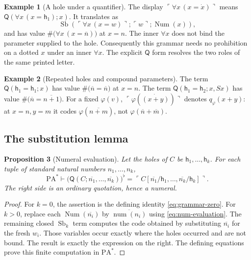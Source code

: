 \documentclass[11pt]{article}
\newcommand{\PA}{\mathrm{PA}^{*}}
\newcommand{\num}{\operatorname{num}}
\newcommand{\Num}{\operatorname{Num}}
\newcommand{\Sb}{\operatorname{Sb}}
\newcommand{\Q}{\mathsf Q}
\newcommand{\h}{\mathsf h}
\newcommand{\code}[1]{\#\bigl(#1\bigr)}
\newcommand{\quo}[1]{\ulcorner #1\urcorner}
\newcommand{\bn}[1]{\overline{#1}}
\newcommand{\flatof}[1]{\bigl(#1\bigr)^{\flat}}
\newtheorem{proposition}{Proposition}[section]
\theoremstyle{definition}
\newtheorem{example}[proposition]{Example}
\begin{document}
\begin{example}[A hole under a quantifier]\label{ex:bound}
The display $\quo{\forall x\,(x=\dot x)}$ means
$\Q(\forall x\,(x=\h_1);x)$. It translates as
\[
  \Sb(\quo{\forall x\,(x=w)};\quo w;\Num(x)),
\]
and has value $\code{\forall x\,(x=\bn n)}$ at $x=n$.
The inner $\forall x$ does not bind the parameter supplied to the
hole. Consequently this grammar needs no prohibition on a dotted $x$
under an inner $\forall x$. The explicit $\Q$ form resolves the two
roles of the same printed letter.
\end{example}

\begin{example}[Repeated holes and compound parameters]
The term $\Q(\h_1=\h_1;x)$ has value
$\code{\bn n=\bn n}$ at $x=n$. The term
$\Q(\h_1=\h_2;x,Sx)$ has value
$\code{\bn n=\bn{n+1}}$. For a fixed $\varphi(v)$,
$\quo{\varphi(\dot{(x+y)})}$ denotes $q_\varphi(x+y)$: at
$x=n,y=m$ it codes $\varphi(\bn{n+m})$, not
$\varphi(\bn n+\bn m)$.
\end{example}

\subsection{The substitution lemma}\label{app:numeral-substitution}

\begin{proposition}[Numeral evaluation]\label{prop:evaluation}
Let the holes of $C$ be $\h_1,\ldots,\h_k$.
For each tuple of standard natural numbers $n_1,\ldots,n_k$,
\begin{equation}\label{eq:lemma}
 \PA\vdash
 \flatof{\Q(C;\bn{n_1},\ldots,\bn{n_k})}
   =\quo{C[\bn{n_1}/\h_1,\ldots,\bn{n_k}/\h_k]}.
\end{equation}
The right side is an ordinary quotation, hence a numeral.
\end{proposition}

\begin{proof}
For $k=0$, the assertion is the defining identity
\eqref{eq:grammar-zero}. For $k>0$, replace each $\Num(\bn{n_i})$ by $\bn{\num(n_i)}$ using
\eqref{eq:num-evaluation}. The remaining closed $\Sb_k$ term
computes the code obtained by substituting $\bn{n_i}$ for the fresh
$w_i$. Those variables occur exactly where the holes occurred and
are not bound. The result is exactly the expression on the right.
The defining equations prove this finite computation in $\PA$.
\end{proof}
\end{document}
